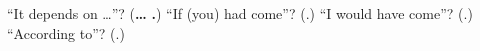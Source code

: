 \begin{tcolorbox}[breakable,colback=teal!4,colframe=teal!35!black,title={Before you move on}]
\textquotedblleft{}It depends on …\textquotedblright{}? (\textbf{… } \textbf{.}) \textquotedblleft{}If (you) had come\textquotedblright{}? (\textbf{}.) \textquotedblleft{}I would have come\textquotedblright{}? (\textbf{}.) \textquotedblleft{}According to\textquotedblright{}? (\textbf{}.)
\end{tcolorbox}
